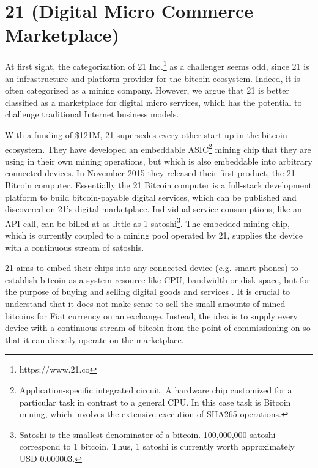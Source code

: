\section{21 (Digital Micro Commerce Marketplace)}
\label{sec:eco21}

At first sight, the categorization of 21 Inc.\footnote{https://www.21.co} as a challenger seems odd, 
since 21 is an infrastructure and platform provider for the bitcoin ecosystem. 
Indeed, it is often categorized as a mining company. However, we argue that 21 
is better classified as a marketplace for digital micro services, which has the 
potential to challenge traditional Internet business models.

With a funding of \$121M, 21 supersedes every other start up in the bitcoin ecosystem. 
They have developed an embeddable ASIC\footnote{ Application-specific integrated 
circuit. A hardware chip customized for a particular task in contrast to a general 
CPU. In this case task is Bitcoin mining, which involves the extensive execution 
of SHA265 operations.} mining chip that they are using in their own mining operations, 
but which is also embeddable into arbitrary connected devices. In November 2015 
they released their first product, the 21 Bitcoin computer. Essentially the 21 
Bitcoin computer is a full-stack development platform to build bitcoin-payable 
digital services, which can be published and discovered on 21's digital marketplace. 
Individual service consumptions, like an API call, can be billed at as little as 
1 satoshi\footnote{Satoshi is the smallest denominator of a bitcoin. 100,000,000 
satoshi correspond to 1 bitcoin. Thus, 1 satoshi is currently worth approximately 
USD 0.000003.}. The embedded mining chip, which is currently coupled to a mining 
pool operated by 21, supplies the device with 
a continuous stream of satoshis.

21 aims to embed their chips into any connected device (e.g. smart phones) to establish 
bitcoin as a system resource like CPU, bandwidth or disk space, but for the purpose 
of buying and selling digital goods and services \parencite{Balaji2015}. It is crucial 
to understand that it does not make sense to sell the small amounts of mined bitcoins 
for Fiat currency on an exchange. Instead, the idea is to supply every device with 
a continuous stream of bitcoin from the point of commissioning on so that it can 
directly operate on the marketplace. 

